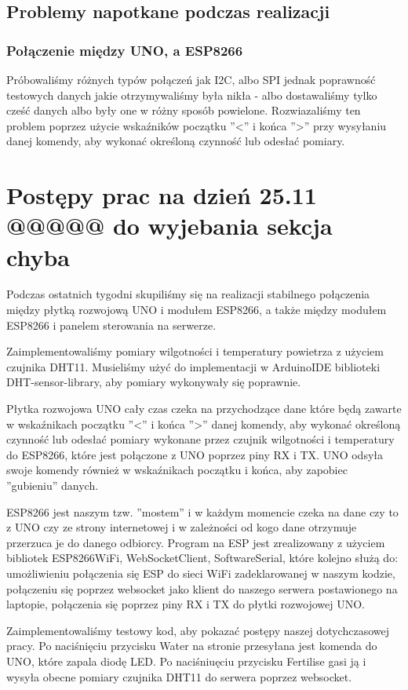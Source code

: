 \documentclass[12pt]{article}
\begin{document}
\subsection{Problemy napotkane podczas realizacji}
\subsubsection{Połączenie między UNO, a ESP8266}
Próbowaliśmy różnych typów połączeń jak I2C, albo SPI jednak poprawność testowych danych jakie otrzymywaliśmy była nikła - albo dostawaliśmy tylko cześć danych albo były one w różny sposób powielone.
Rozwiazaliśmy ten problem poprzez użycie wskaźników początku ''<'' i końca ''>'' przy wysyłaniu danej komendy, aby wykonać określoną czynność lub odesłać pomiary. 

\section{Postępy prac na dzień 25.11 @@@@@ do wyjebania sekcja chyba}
Podczas ostatnich tygodni skupiliśmy się na realizacji stabilnego połączenia między płytką rozwojową UNO i modułem ESP8266, a także między modułem ESP8266 i panelem sterowania na serwerze.

Zaimplementowaliśmy pomiary wilgotności i temperatury powietrza z użyciem czujnika DHT11. Musieliśmy użyć do implementacji w ArduinoIDE biblioteki DHT-sensor-library, aby pomiary wykonywały się poprawnie.

Płytka rozwojowa UNO cały czas czeka na przychodzące dane które będą zawarte w wskaźnikach początku ''<'' i końca ''>'' danej komendy, aby wykonać określoną czynność lub odesłać pomiary wykonane przez czujnik wilgotności i temperatury do ESP8266, które jest połączone z UNO poprzez piny RX i TX. UNO odsyła swoje komendy również w wskaźnikach początku i końca, aby zapobiec ''gubieniu'' danych.

ESP8266 jest naszym tzw. ''mostem'' i w każdym momencie czeka na dane czy to z UNO czy ze strony internetowej i w zależności od kogo dane otrzymuje przerzuca je do danego odbiorcy.
Program na ESP jest zrealizowany z użyciem bibliotek ESP8266WiFi, WebSocketClient, SoftwareSerial, które kolejno służą do: umożliwieniu połączenia się ESP do sieci WiFi zadeklarowanej w naszym kodzie, połączeniu się poprzez websocket jako klient do naszego serwera postawionego na laptopie, połączenia się poprzez piny RX i TX do płytki rozwojowej UNO.

Zaimplementowaliśmy testowy kod, aby pokazać postępy naszej dotychczasowej pracy. Po naciśnięciu przycisku Water na stronie przesyłana jest komenda do UNO, które zapala diodę LED. Po naciśniuęciu przycisku Fertilise gasi ją i wysyła obecne pomiary czujnika DHT11 do serwera poprzez websocket.
\end{document}
